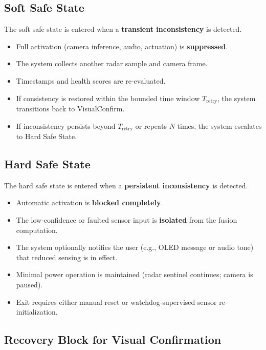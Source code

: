 \documentclass[12pt]{extarticle}
\begin{document}
\subsection{Soft Safe State}

The soft safe state is entered when a \textbf{transient inconsistency} is detected.

\begin{itemize}
  \item Full activation (camera inference, audio, actuation) is \textbf{suppressed}.
  \item The system collects another radar sample and camera frame.
  \item Timestamps and health scores are re-evaluated.
  \item If consistency is restored within the bounded time window $T_{\text{retry}}$,
        the system transitions back to VisualConfirm.
  \item If inconsistency persists beyond $T_{\text{retry}}$ or repeats $N$ times,
        the system escalates to Hard Safe State.
\end{itemize}

\subsection{Hard Safe State}

The hard safe state is entered when a \textbf{persistent inconsistency} is detected.

\begin{itemize}
  \item Automatic activation is \textbf{blocked completely}.
  \item The low-confidence or faulted sensor input is \textbf{isolated} from the
        fusion computation.
  \item The system optionally notifies the user (e.g., OLED message or audio tone)
        that reduced sensing is in effect.
  \item Minimal power operation is maintained (radar sentinel continues; camera is
        paused).
  \item Exit requires either manual reset or watchdog-supervised sensor re-initialization.
\end{itemize}

\subsection{Recovery Block for Visual Confirmation}
\end{document}
